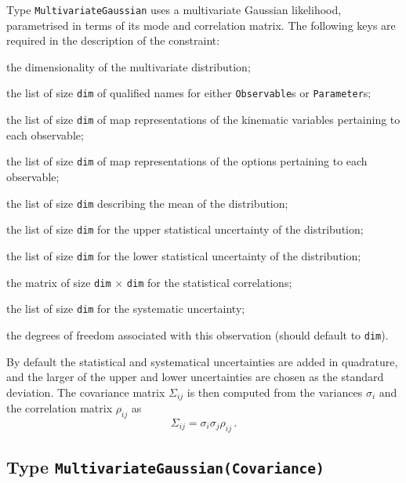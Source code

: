 Type \texttt{MultivariateGaussian} uses a multivariate Gaussian likelihood,
parametrised in terms of its mode and correlation matrix. The following keys
are required in the description of the constraint:
\begin{description}[labelwidth=.15\textwidth]
    \item[\texttt{dim}] the dimensionality of the multivariate distribution;
    \item[\texttt{observable}] the list of size \texttt{dim} of qualified names for either \texttt{Observable}s or \texttt{Parameter}s;
    \item[\texttt{kinematics}] the list of size \texttt{dim} of map representations of the kinematic variables pertaining to each observable;
    \item[\texttt{options}] the list of size \texttt{dim} of map representations of the options pertaining to each observable;
    \item[\texttt{mean}] the list of size \texttt{dim} describing the mean of the distribution;
    \item[\texttt{sigma-stat-hi}] the list of size \texttt{dim} for the upper statistical uncertainty of the distribution;
    \item[\texttt{sigma-stat-lo}] the list of size \texttt{dim} for the lower statistical uncertainty of the distribution;
    \item[\texttt{correlations}] the matrix of size \texttt{dim} $\times$ \texttt{dim} for the statistical correlations;
    \item[\texttt{sigma-sys}] the list of size \texttt{dim} for the systematic uncertainty;
    \item[\texttt{dof}] the degrees of freedom associated with this observation (should default to \texttt{dim}).
\end{description}
By default the statistical and systematical uncertainties are added in
quadrature, and the larger of the upper and lower uncertainties are chosen as
the standard deviation. The covariance matrix $\Sigma_{ij}$ is then computed from
the variances $\sigma_i$ and the correlation matrix $\rho_{ij}$ as
\begin{equation}
    \Sigma_{ij} = \sigma_i \sigma_j \rho_{ij}\,.
\end{equation}

\subsection{Type \texttt{MultivariateGaussian(Covariance)}}

